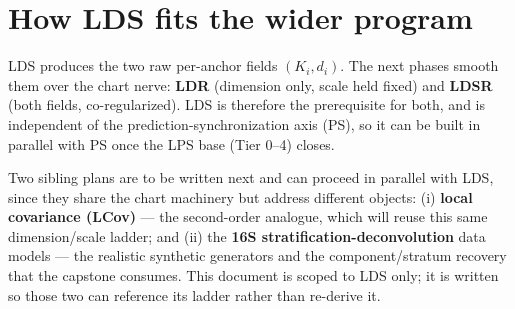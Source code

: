 \documentclass[11pt]{article}
\begin{document}
\section{How LDS fits the wider program}\label{sec:program}

LDS produces the two raw per-anchor fields $(K_i,d_i)$. The next phases smooth them
over the chart nerve: \textbf{LDR} (dimension only, scale held fixed) and
\textbf{LDSR} (both fields, co-regularized). LDS is therefore the prerequisite for
both, and is independent of the prediction-synchronization axis (PS), so it can be
built in parallel with PS once the LPS base (Tier 0--4) closes.

Two sibling plans are to be written next and can proceed in parallel with LDS, since
they share the chart machinery but address different objects: (i) \textbf{local
covariance (LCov)} --- the second-order analogue, which will reuse this same
dimension/scale ladder; and (ii) the \textbf{16S stratification-deconvolution} data
models --- the realistic synthetic generators and the component/stratum recovery that
the capstone consumes. This document is scoped to LDS only; it is written so those two
can reference its ladder rather than re-derive it.
\end{document}
